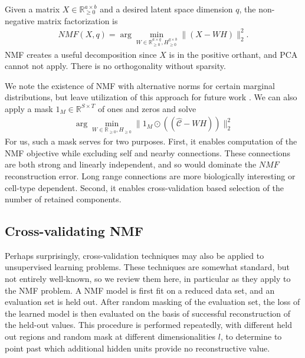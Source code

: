 Given a matrix $X \in \mathbb R_{\geq 0}^{a \times b}$ and a desired latent space dimension $q$, the non-negative matrix factorization is
\begin{eqnarray*}
NMF(X, q) = \arg \min_{W \in \mathbb R_{\geq 0}^{a \times q} ,H_{\geq 0}^{q \times b }} \| (  X  - WH)\|_2^2.
\end{eqnarray*}
NMF creates a useful decomposition since $X$ is in the positive orthant, and PCA cannot not apply.
There is no orthogonality without sparsity.

We note the existence of NMF with alternative norms for certain marginal distributions, but leave utilization of this approach for future work \citep{Brunet2004-gi}.
We can also apply a mask $1_M \in \mathbb R^{S \times T}$ of ones and zeros and solve
\begin{eqnarray*}
\arg \min_{W \in \mathbb R_{\geq 0} ,H_{\geq 0} } \| 1_M \odot  ((\hat{  \mathcal C}  - WH))\|_2^2
\end{eqnarray*}
For us, such a mask serves for two purposes.
First, it enables computation of the NMF objective while excluding self and nearby connections.
These connections are both strong and linearly independent, and so would dominate the $NMF$ reconstruction error.
Long range connections are more biologically interesting or cell-type dependent.
Second, it enables cross-validation based selection of the number of retained components.

\subsection{Cross-validating NMF}

Perhaps surprisingly, cross-validation techniques may also be applied to unsupervised learning problems.
These techniques are somewhat standard, but not entirely well-known, so we review them here, in particular as they apply to the NMF problem.
A NMF model is first fit on a reduced data set, and an evaluation set is held out.
After random masking of the evaluation set, the loss of the learned model is then evaluated on the basis of successful reconstruction of the held-out values.
This procedure is performed repeatedly, with different held out regions and random mask at different dimensionalities $l$, to determine to point past which additional hidden units provide no reconstructive value.

